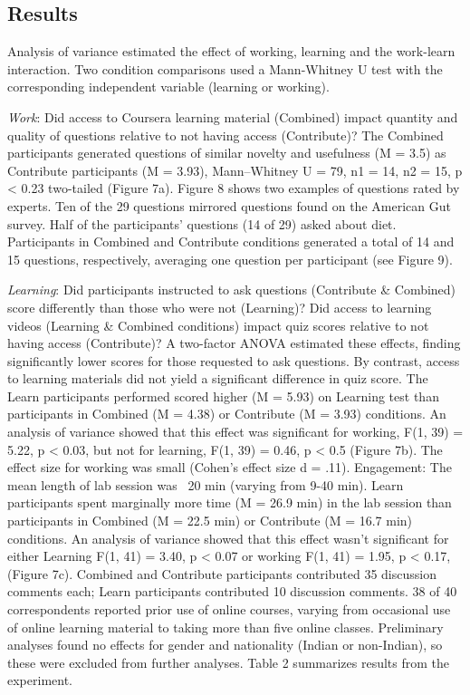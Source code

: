 \subsection{Results}
Analysis of variance estimated the effect of working, learning and the work-learn interaction. Two condition comparisons used a Mann-Whitney U test with the corresponding independent variable (learning or working). 

\textit{Work}: Did access to Coursera learning material (Combined) impact quantity and quality of questions relative to not having access (Contribute)? The Combined participants generated questions of similar novelty and usefulness (M = 3.5) as Contribute participants (M = 3.93), Mann–Whitney U = 79, n1 = 14, n2 = 15, p < 0.23 two-tailed (Figure 7a). Figure 8 shows two examples of questions rated by experts. Ten of the 29 questions mirrored questions found on the American Gut survey. Half of the participants’ questions (14 of 29) asked about diet. Participants in Combined and Contribute conditions generated a total of 14 and 15 questions, respectively, averaging one question per participant (see Figure 9). 

\textit{Learning}: Did participants instructed to ask questions (Contribute \& Combined) score differently than those who were not (Learning)? Did access to learning videos (Learning \& Combined conditions) impact quiz scores relative to not having access (Contribute)? A two-factor ANOVA estimated these effects, finding significantly lower scores for those requested to ask questions. By contrast, access to learning materials did not yield a significant difference in quiz score.
The Learn participants performed scored higher (M = 5.93) on Learning test than participants in Combined (M = 4.38) or Contribute (M = 3.93) conditions. An analysis of variance showed that this effect was significant for working, F(1, 39) = 5.22, p < 0.03, but not for learning, F(1, 39) = 0.46, p < 0.5 (Figure 7b). The effect size for working was small (Cohen’s effect size d = .11).
Engagement: The mean length of lab session was ~20 min (varying from 9-40 min). Learn participants spent marginally more time (M = 26.9 min) in the lab session than participants in Combined (M = 22.5 min) or Contribute (M = 16.7 min) conditions. An analysis of variance showed that this effect wasn’t significant for either Learning F(1, 41) = 3.40, p < 0.07 or working F(1, 41) = 1.95, p < 0.17, (Figure 7c). Combined and Contribute participants contributed 35 discussion comments each; Learn participants contributed 10 discussion comments.
38 of 40 correspondents reported prior use of online courses, varying from occasional use of online learning material to taking more than five online classes. Preliminary analyses found no effects for gender and nationality (Indian or non-Indian), so these were excluded from further analyses. Table 2 summarizes results from the experiment. 

